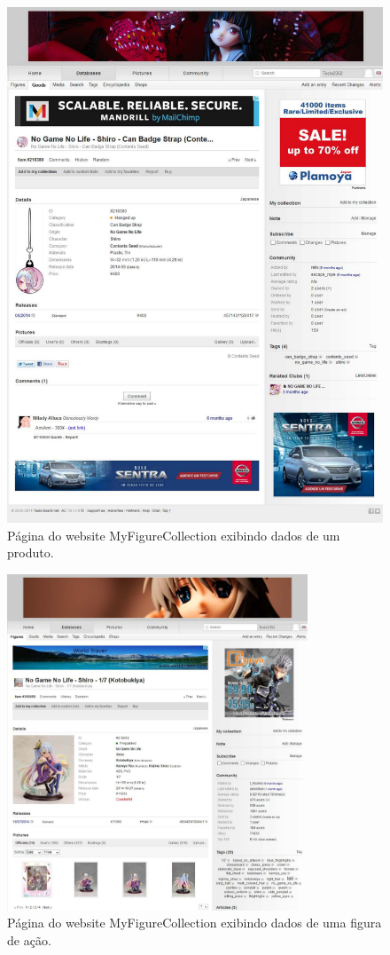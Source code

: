 \documentclass[12pt]{article}
\begin{document}
\begin{figure}[H]
\centering
\includegraphics[width=1\textwidth]{ngnlmyfigure.pdf}
\caption{Página do website MyFigureCollection exibindo dados de um produto.} \label{collection}
\end{figure}

\begin{figure}[H]
\centering
\includegraphics[height=0.45\textheight,width=0.8\textwidth]{ngnlmyfigure2.pdf}
\caption{Página do website MyFigureCollection exibindo dados de uma figura de ação.} \label{collection}
\end{figure}
\end{document}
